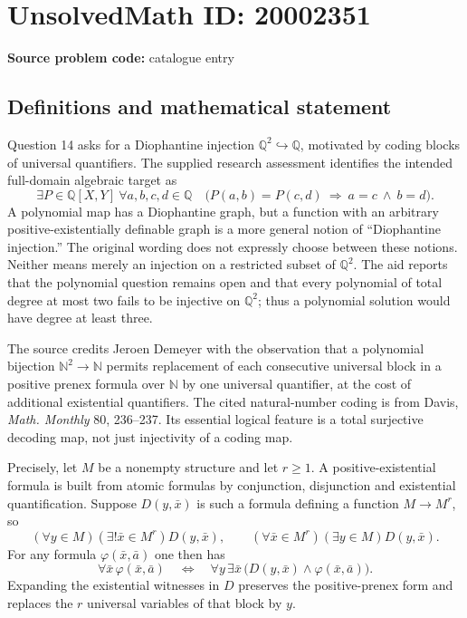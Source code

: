 \documentclass[11pt]{article}
\newcommand{\N}{\mathbb{N}}
\newcommand{\Q}{\mathbb{Q}}
\begin{document}
\section*{UnsolvedMath ID: 20002351}
\textbf{Source problem code:} catalogue entry
\subsection{Definitions and mathematical statement}
Question 14 asks for a Diophantine injection $\Q^2\hookrightarrow\Q$, motivated by coding blocks of universal quantifiers. The supplied research assessment identifies the intended full-domain algebraic target as
\[
 \exists P\in\Q[X,Y]\ \forall a,b,c,d\in\Q\quad
 \bigl(P(a,b)=P(c,d)\ \Longrightarrow\ a=c\ \wedge\ b=d\bigr).
\]
A polynomial map has a Diophantine graph, but a function with an arbitrary positive-existentially definable graph is a more general notion of ``Diophantine injection.'' The original wording does not expressly choose between these notions. Neither means merely an injection on a restricted subset of $\Q^2$. The aid reports that the polynomial question remains open and that every polynomial of total degree at most two fails to be injective on $\Q^2$; thus a polynomial solution would have degree at least three.

The source credits Jeroen Demeyer with the observation that a polynomial bijection $\N^2\to\N$ permits replacement of each consecutive universal block in a positive prenex formula over $\N$ by one universal quantifier, at the cost of additional existential quantifiers. The cited natural-number coding is from Davis, \emph{Math. Monthly} 80, 236--237. Its essential logical feature is a total surjective decoding map, not just injectivity of a coding map.

Precisely, let $M$ be a nonempty structure and let $r\ge1$. A positive-existential formula is built from atomic formulas by conjunction, disjunction and existential quantification. Suppose $D(y,\bar x)$ is such a formula defining a function $M\to M^r$, so
\[
 (\forall y\in M)(\exists!\bar x\in M^r)D(y,\bar x),
 \qquad
 (\forall\bar x\in M^r)(\exists y\in M)D(y,\bar x).
\]
For any formula $\varphi(\bar x,\bar a)$ one then has
\[
 \forall\bar x\,\varphi(\bar x,\bar a)
 \quad\Longleftrightarrow\quad
 \forall y\,\exists\bar x\,
       \bigl(D(y,\bar x)\wedge\varphi(\bar x,\bar a)\bigr).
\]
Expanding the existential witnesses in $D$ preserves the positive-prenex form and replaces the $r$ universal variables of that block by $y$.
\end{document}
